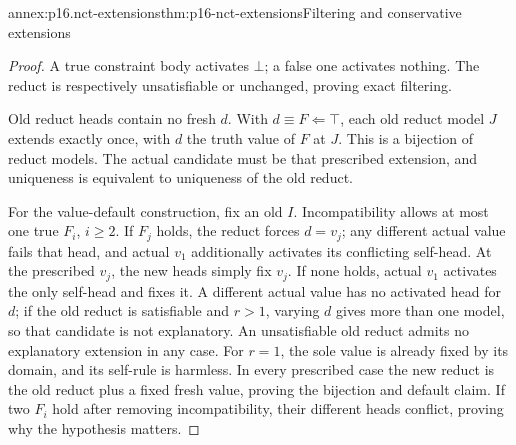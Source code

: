 \begin{annexitem}{annex:p16.nct-extensions}{thm:p16-nct-extensions}{Filtering and conservative extensions}
\begin{proof}
A true constraint body activates \(\bot\); a false one activates nothing.
The reduct is respectively unsatisfiable or unchanged, proving exact filtering.

Old reduct heads contain no fresh \(d\). With \(d\equiv F\Leftarrow\top\),
each old reduct model \(J\) extends exactly once, with \(d\) the truth value
of \(F\) at \(J\). This is a bijection of reduct models.
The actual candidate must be that prescribed extension, and uniqueness
is equivalent to uniqueness of the old reduct.

For the value-default construction, fix an old \(I\).
Incompatibility allows at most one true \(F_i\), \(i\geq2\).
If \(F_j\) holds, the reduct forces \(d=v_j\); any different actual value
fails that head, and actual \(v_1\) additionally activates its conflicting
self-head. At the prescribed \(v_j\), the new heads simply fix \(v_j\).
If none holds, actual \(v_1\) activates the only self-head and fixes it.
A different actual value has no activated head for \(d\); if the old
reduct is satisfiable and \(r>1\), varying \(d\) gives more than one model,
so that candidate is not explanatory. An unsatisfiable old reduct admits
no explanatory extension in any case. For \(r=1\), the sole value is already
fixed by its domain, and its self-rule is harmless.
In every prescribed case the new reduct is the old reduct plus a fixed fresh
value, proving the bijection and default claim.
If two \(F_i\) hold after removing incompatibility, their different heads
conflict, proving why the hypothesis matters.
\end{proof}
\end{annexitem}

